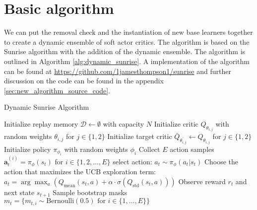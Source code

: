 \section{Basic algorithm}

We can put the removal check and the instantiation of new base learners together to create a dynamic ensemble of soft actor critics. The algorithm is based on the Sunrise algorithm \cite{leeSUNRISESimpleUnified2021} with the addition of the dynamic ensemble. The algorithm is outlined in Algorithm \ref{alg:dynamic_sunrise}. A implementation of the algorithm can be found at \url{https://github.com/1jamesthompson1/sunrise} and further discussion on the code can be found in the appendix \ref{sec:new_algorithm_source_code}.

\begin{algorithm}
\caption{Dynamic Sunrise Algorithm}
\label{alg:dynamic_sunrise}
\begin{algorithmic}[1]
\State Initialize replay memory $\mathcal{D} \leftarrow \emptyset$ with capacity $N$
    \State Initialize critic $Q_{\theta_{i,j}}$ with random weights $\theta_{i,j}$ for $j \in \{1,2\}$
    \State Initialize target critic $\bar{Q}_{\bar{\theta_{i,j}}} \leftarrow Q_{\theta_{i,j}}$ for $j \in \{1,2\}$
    \State Initialize policy $\pi_{\phi_i}$ with random weights $\phi_i$
\EndFor
\Repeat
        \State Collect $E$ action samples $\bm{a}_{t}^{(i)} = \pi_{\phi}(s_{t})$ for $i \in \{1,2,\ldots,E\}$
        \State select action: $a_{t} \sim \pi_{\phi}(a_{t} | s_{t})$
        \State Choose the action that maximizes the UCB exploration term:
        \State $a_{t} = \arg\max_{a} \left( Q_{\text{mean}}(s_{t}, a) + \alpha \cdot \sigma(Q_{\text{std}}(s_{t}, a)) \right)$
        \State Observe reward $r_{t}$ and next state $s_{t+1}$
        \State Sample bootstrap masks $m_{t} = \{m_{t,i} \sim \text{Bernoulli}(0.5) \text{ for } i \in \{1,..., E\}\}$

\end{algorithmic}
\end{algorithm}
